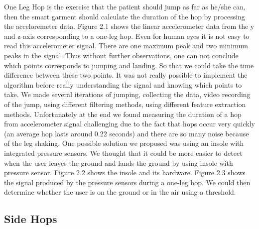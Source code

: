 One Leg Hop is the exercise that the patient should jump as far as he/she can, then the smart garment should calculate the duration of the hop by processing the acceloremeter data. 
Figure 2.1 shows the linear accelerometer data from the y and z-axis corresponding to a one-leg hop. Even for human eyes it is not easy to read this accelerometer signal. There are one maximum peak and two minimum peaks in the signal. Thus without further observations, one can not conclude which points corresponds to jumping and landing. So that we could take the time difference between these two points. It was not really possible to implement the algorithm before really understanding the signal and knowing which points to take. We made several iterations of jumping, collecting the data, video recording of the jump, using different filtering methods, using different feature extraction methods. Unfortunately at the end we found measuring the duration of a hop from accelerometer signal challenging due to the fact that hops occur very quickly (an average hop lasts around 0.22 seconds) and there are so many noise because of the leg shaking. One possible solution we proposed was using an insole with integrated pressure sensors. We thought that it could be more easier to detect when the user leaves the ground and lands the ground by using insole with pressure sensor. Figure 2.2 shows the insole and its hardware. Figure 2.3 shows the signal produced by the pressure sensors during a one-leg hop. We could then determine whether the user is on the ground or in the air using a threshold. 


\subsection{	Side Hops}

